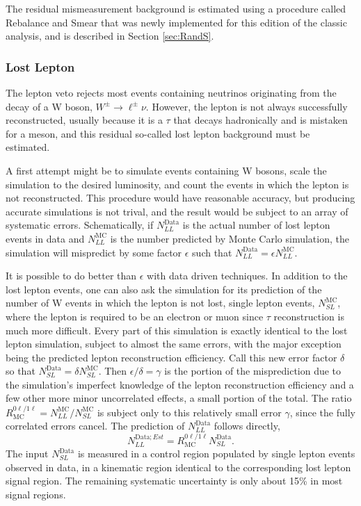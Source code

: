     The residual mismeasurement background is estimated using a procedure called Rebalance and Smear that was newly implemented for this edition of the classic analysis, and is described in Section \ref{sec:RandS}.
    
    \subsubsection{Lost Lepton} \label{sec:MT2lostlep}

    The lepton veto rejects most events containing neutrinos originating from the decay of a W boson, $W^{\pm}\rightarrow \ell^{\pm}\nu$.
    However, the lepton is not always successfully reconstructed, usually because it is a $\tau$ that decays hadronically and is mistaken for a meson, and this residual so-called lost lepton background must be estimated. 

    A first attempt might be to simulate events containing W bosons, scale the simulation to the desired luminosity, and count the events in which the lepton is not reconstructed.
    This procedure would have reasonable accuracy, but producing accurate simulations is not trival, and the result would be subject to an array of systematic errors.
    Schematically, if $N_{LL}^{\mathrm{Data}}$ is the actual number of lost lepton events in data and $N_{LL}^{\mathrm{MC}}$ is the number predicted by Monte Carlo simulation, the simulation will mispredict by some factor $\epsilon$ such that $N_{LL}^{\mathrm{Data}} = \epsilon N_{LL}^{\mathrm{MC}}$.

    It is possible to do better than $\epsilon$ with data driven techniques.
    In addition to the lost lepton events, one can also ask the simulation for its prediction of the number of W events in which the lepton is not lost, single lepton events, $N_{SL}^{\mathrm{MC}}$, where the lepton is required to be an electron or muon since $\tau$ reconstruction is much more difficult.
    Every part of this simulation is exactly identical to the lost lepton simulation, subject to almost the same errors, with the major exception being the predicted lepton reconstruction efficiency.
    Call this new error factor $\delta$ so that $N_{SL}^{\mathrm{Data}}=\delta N_{SL}^{\mathrm{MC}}$.
    Then $\epsilon/\delta = \gamma$ is the portion of the misprediction due to the simulation's imperfect knowledge of the lepton reconstruction efficiency and a few other more minor uncorrelated effects, a small portion of the total.
    The ratio $R_{\mathrm{MC}}^{0\ell/1\ell} = N_{LL}^{\mathrm{MC}} / N_{SL}^{\mathrm{MC}}$ is subject only to this relatively small error $\gamma$, since the fully correlated errors cancel.
    The prediction of $N_{LL}^{\mathrm{Data}}$ follows directly,
    \begin{equation}
      N_{LL}^{\mathrm{Data};Est} = R_{\mathrm{MC}}^{0\ell/1\ell} N_{SL}^{\mathrm{Data}}.
    \end{equation}
    The input $N_{SL}^{\mathrm{Data}}$ is measured in a control region populated by single lepton events observed in data, in a kinematic region identical to the corresponding lost lepton signal region.
    The remaining systematic uncertainty is only about 15\% in most signal regions.

